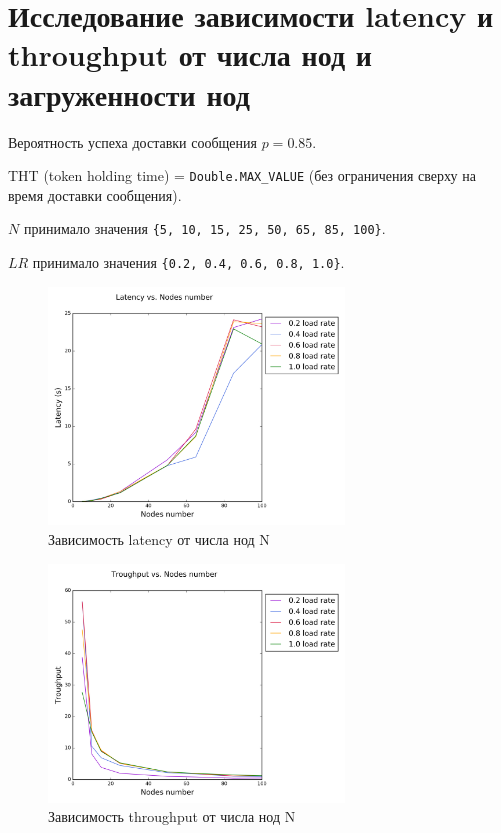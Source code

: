 \documentclass{article}
\begin{document}
\section{Исследование зависимости latency и throughput от числа нод и загруженности нод}

Вероятность успеха доставки сообщения $p=0.85$.

THT (token holding time) = \lstinline|Double.MAX_VALUE| (без ограничения сверху на время доставки сообщения).

$N$ принимало значения \lstinline|{5, 10, 15, 25, 50, 65, 85, 100}|. 

$LR$ принимало значения \lstinline|{0.2, 0.4, 0.6, 0.8, 1.0}|.

\begin{figure}[H]
\centering
\includegraphics[width=0.7\textwidth]{Plots/LNN.png}
\caption{Зависимость latency от числа нод N}
\end{figure}

\begin{figure}[H]
\centering
\includegraphics[width=0.7\textwidth]{Plots/TNN.png}
\caption{Зависимость throughput от числа нод N}
\end{figure}
\end{document}
